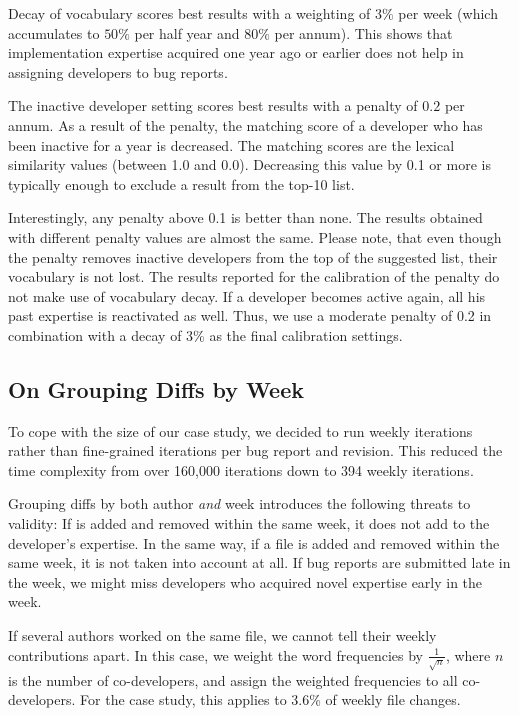 \documentclass[10pt]{book}
\begin{document}
Decay of vocabulary scores best results with a weighting of $3\%$ per week (which accumulates to $50\%$ per half year and $80\%$ per annum). This shows that implementation expertise acquired one year ago or earlier does not help in assigning developers to bug reports.

The inactive developer setting scores best results with a penalty of $0.2$ per annum. As a result of the penalty, the matching score of a developer who has been inactive for a year is decreased. The matching scores are the lexical similarity values (between 1.0 and 0.0). Decreasing this value by 0.1 or more is typically enough to exclude a result from the top-10 list. 

Interestingly, any penalty above 0.1 is better than none. The results obtained with different penalty values are almost the same. Please note, that even though the penalty removes inactive developers from the top of the suggested list, their vocabulary is not lost. The results reported for the calibration of the penalty do not make use of vocabulary decay. If a developer becomes active again, all his past expertise is reactivated as well. Thus, we use a moderate penalty of 0.2 in combination with a decay of 3\% as the final calibration settings.

\subsection{On Grouping Diffs by Week}

To cope with the size of our case study, we decided to run weekly iterations rather than fine-grained iterations per bug report and revision. This reduced the time complexity from over 160,000 iterations down to 394 weekly iterations.

Grouping diffs by both author \emph{and} week introduces the following threats to validity: 
If \VOC is added and removed within the same week, it does not add to the developer's expertise. 
In the same way, if a file is added and removed within the same week, it is not taken into account at all. 
If bug reports are submitted late in the week, we might miss developers who acquired novel expertise early in the week. 

If several authors worked on the same file, we cannot tell their weekly contributions apart. In this case, we weight the word frequencies by $\frac{1}{\sqrt{n}}$, where $n$ is the number of co-developers, and assign the weighted frequencies to all co-developers. For the \EC case study, this applies to 3.6\% of weekly file changes.
\end{document}
